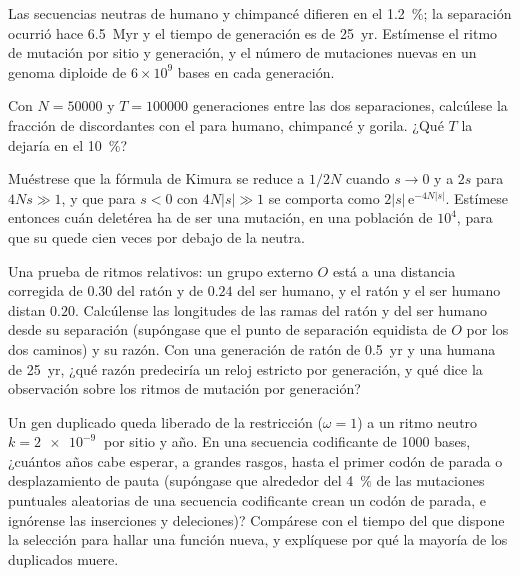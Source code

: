 \begin{exercise}[$\star\star$]\label{exo:b3:molecular-evolution:8}
Las secuencias neutras de humano y chimpancé difieren en el
\qty{1.2}{\%}; la separación ocurrió hace \qty{6.5}{Myr} y el tiempo de
generación es de \qty{25}{yr}. Estímense el ritmo de mutación por sitio
y generación, y el número de mutaciones nuevas en un genoma diploide de
$6\times 10^{9}$ bases en cada generación.
\end{exercise}

\begin{exercise}[$\star\star$]\label{exo:b3:molecular-evolution:9}
Con $N = \num{50000}$ y $T = \num{100000}$ generaciones entre las dos
separaciones, calcúlese la fracción de  discordantes
con el  para humano, chimpancé y gorila. ¿Qué $T$ la
dejaría en el \qty{10}{\%}?
\end{exercise}

\begin{exercise}[$\star\star\star$]\label{exo:b3:molecular-evolution:10}
Muéstrese que la fórmula de Kimura se reduce a $1/2N$ cuando $s \to 0$
y a $2s$ para $4Ns \gg 1$, y que para $s < 0$ con $4N|s| \gg 1$ se
comporta como $2|s|\,\mathrm{e}^{-4N|s|}$. Estímese entonces cuán
deletérea ha de ser una mutación, en una población de $10^{4}$, para que
su  quede cien veces por debajo de la neutra.
\end{exercise}

\begin{exercise}[$\star\star\star$]\label{exo:b3:molecular-evolution:11}
Una prueba de ritmos relativos: un grupo externo $O$ está a una
distancia corregida de $0.30$ del ratón y de $0.24$ del ser humano, y
el ratón y el ser humano distan $0.20$. Calcúlense las longitudes de las
ramas del ratón y del ser humano desde su separación (supóngase que el
punto de separación equidista de $O$ por los dos caminos) y su razón.
Con una generación de ratón de \qty{0.5}{yr} y una humana de
\qty{25}{yr}, ¿qué razón predeciría un reloj estricto por generación, y
qué dice la observación sobre los ritmos de mutación por generación?
\end{exercise}

\begin{exercise}[$\star\star\star$]\label{exo:b3:molecular-evolution:12}
Un gen duplicado queda liberado de la restricción ($\omega = 1$) a un
ritmo neutro $k = \qty{2e-9}{}$ por sitio y año. En una secuencia
codificante de 1000 bases, ¿cuántos años cabe esperar, a grandes rasgos,
hasta el primer codón de parada o desplazamiento de pauta (supóngase que
alrededor del \qty{4}{\%} de las mutaciones puntuales aleatorias de una
secuencia codificante crean un codón de parada, e ignórense las
inserciones y deleciones)? Compárese con el tiempo del que dispone la
selección para hallar una función nueva, y explíquese por qué la mayoría
de los duplicados muere.
\end{exercise}

